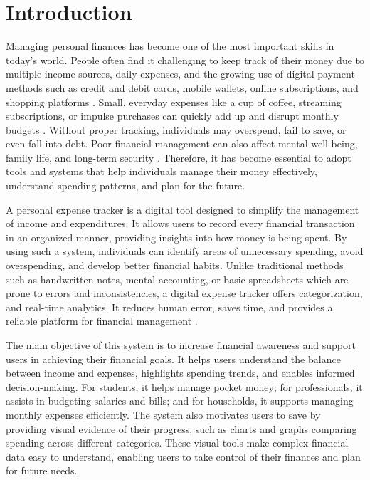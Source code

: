\documentclass[12pt]{report}
\begin{document}
\section{Introduction}
Managing personal finances has become one of the most important skills in today's world.
People often find it challenging to keep track of their money due to multiple income
sources, daily expenses, and the growing use of digital payment methods such as credit and
debit cards, mobile wallets, online subscriptions, and shopping platforms \cite{singh2021spending}. Small, everyday
expenses like a cup of coffee, streaming subscriptions, or impulse purchases can quickly add
up and disrupt monthly budgets \cite{chandini2019online}. Without proper tracking, individuals may overspend, fail
to save, or even fall into debt. Poor financial management can also affect mental well-being,
family life, and long-term security \cite{verma2024research}. Therefore, it has become essential to adopt tools and
systems that help individuals manage their money effectively, understand spending patterns,
and plan for the future.

A personal expense tracker is a digital tool designed to simplify the management of income 
and expenditures. It allows users to record every financial transaction in an organized
manner, providing insights into how money is being spent. By using such a system, individuals
can identify areas of unnecessary spending, avoid overspending, and develop better
financial habits. Unlike traditional methods such as handwritten notes, mental accounting,
or basic spreadsheets which are prone to errors and inconsistencies, a digital expense tracker
offers categorization, and real-time analytics. It reduces human error, saves
time, and provides a reliable platform for financial management \cite{verma2024research}.

The main objective of this system is to increase financial awareness and support users in
achieving their financial goals. It helps users understand the balance between income and
expenses, highlights spending trends, and enables informed decision-making. For students,
it helps manage pocket money; for professionals, it assists in budgeting salaries and bills;
and for households, it supports managing monthly expenses efficiently. The system also
motivates users to save by providing visual evidence of their progress, such as charts and
graphs comparing spending across different categories. These visual tools make complex
financial data easy to understand, enabling users to take control of their finances and plan
for future needs.
\end{document}
